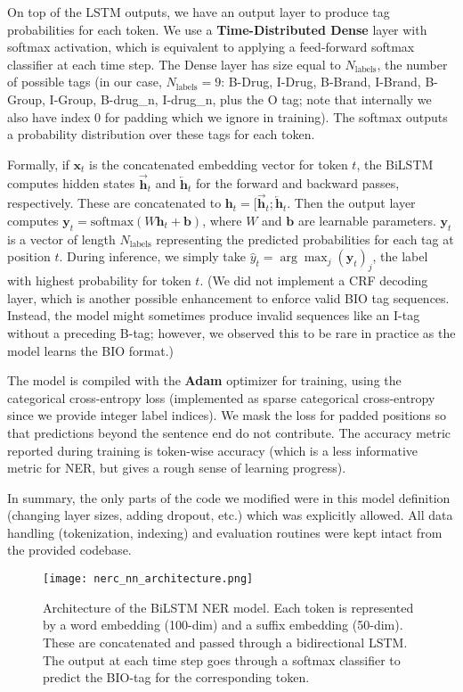 On top of the LSTM outputs, we have an output layer to produce tag probabilities for each token. We use a \textbf{Time-Distributed Dense} layer with softmax activation, which is equivalent to applying a feed-forward softmax classifier at each time step. The Dense layer has size equal to $N_{\text{labels}}$, the number of possible tags (in our case, $N_{\text{labels}}=9$: B-Drug, I-Drug, B-Brand, I-Brand, B-Group, I-Group, B-drug\_n, I-drug\_n, plus the O tag; note that internally we also have index 0 for padding which we ignore in training). The softmax outputs a probability distribution over these tags for each token.

Formally, if $\mathbf{x}_t$ is the concatenated embedding vector for token $t$, the BiLSTM computes hidden states $\overrightarrow{\mathbf{h}}_t$ and $\overleftarrow{\mathbf{h}}_t$ for the forward and backward passes, respectively. These are concatenated to $\mathbf{h}_t = [\overrightarrow{\mathbf{h}}_t; \overleftarrow{\mathbf{h}}_t$. Then the output layer computes $\mathbf{y}_t = \text{softmax}(W \mathbf{h}_t + \mathbf{b})$, where $W$ and $\mathbf{b}$ are learnable parameters. $\mathbf{y}_t$ is a vector of length $N_{\text{labels}}$ representing the predicted probabilities for each tag at position $t$. During inference, we simply take $\hat{y}_t = \arg\max_j (\mathbf{y}_t)_j$, the label with highest probability for token $t$. (We did not implement a CRF decoding layer, which is another possible enhancement to enforce valid BIO tag sequences. Instead, the model might sometimes produce invalid sequences like an I-tag without a preceding B-tag; however, we observed this to be rare in practice as the model learns the BIO format.)

The model is compiled with the \textbf{Adam} optimizer for training, using the categorical cross-entropy loss (implemented as sparse categorical cross-entropy since we provide integer label indices). We mask the loss for padded positions so that predictions beyond the sentence end do not contribute. The accuracy metric reported during training is token-wise accuracy (which is a less informative metric for NER, but gives a rough sense of learning progress).

In summary, the only parts of the code we modified were in this model definition (changing layer sizes, adding dropout, etc.) which was explicitly allowed. All data handling (tokenization, indexing) and evaluation routines were kept intact from the provided codebase.

\begin{figure}[t]\centering
\texttt{[image: nerc\_nn\_architecture.png]}
\caption{Architecture of the BiLSTM NER model. Each token is represented by a word embedding (100-dim) and a suffix embedding (50-dim). These are concatenated and passed through a bidirectional LSTM. The output at each time step goes through a softmax classifier to predict the BIO-tag for the corresponding token.}
\label{fig:architecture}
\end{figure} 